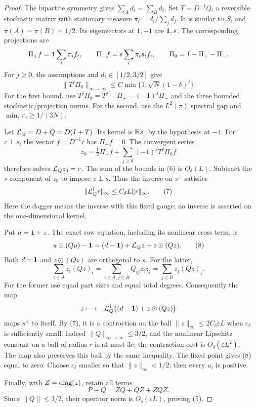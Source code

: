 \begin{proof}
The bipartite symmetry gives
\(\sum_A d_i=\sum_Bd_i\).
Set \(T=D^{-1}Q\), a reversible stochastic matrix with stationary
measure \(\pi_i=d_i/\sum_jd_j\).
It is similar to \(S\), and
\(\pi(A)=\pi(B)=1/2\).
Its eigenvectors at \(1,-1\) are \(\mathbf1,s\).
The corresponding projections are
\[
 \Pi_+f=\mathbf1\sum_i\pi_i f_i,\qquad
 \Pi_-f=s\sum_i\pi_i s_i f_i,\qquad
 \Pi_0=I-\Pi_+-\Pi_-.
\]
For \(j\geq0\), the assumptions and \(d_i\in[1/2,3/2]\) give
\[
 \|T^j\Pi_0\|_{\infty\to\infty}
 \leq C\min\{1,\sqrt N(1-\delta)^j\}.                         \tag{6}
\]
For the first bound, use \(T^j\Pi_0=T^j-\Pi_+-(-1)^j\Pi_-\)
and the three bounded stochastic/projection norms.
For the second, use the \(L^2(\pi)\) spectral gap and
\(\min_i\pi_i\geq1/(3N)\).

Let \({\cal L}_Q=D+Q=D(I+T)\).
Its kernel is \(\mathbb R s\), by the hypothesis at \(-1\).
For \(r\perp s\), the vector \(f=D^{-1}r\) has
\(\Pi_-f=0\).
The convergent series
\[
 z_0=\tfrac12\Pi_+f+
                 \sum_{j\geq0}(-1)^jT^j\Pi_0f
\]
therefore solves \({\cal L}_Qz_0=r\).
The sum of the bounds in (6) is \(O_\delta(L)\).
Subtract the \(s\)-component of \(z_0\) to impose \(z\perp s\).
Thus the inverse on \(s^\perp\) satisfies
\[
 \|{\cal L}_Q^\dagger r\|_\infty
                    \leq C_\delta L\|r\|_\infty.             \tag{7}
\]
Here the dagger means the inverse with this fixed gauge;
no inverse is asserted on the one-dimensional kernel.

Put \(u=\mathbf1+z\).
The exact row equation, including its nonlinear cross term, is
\[
 u\odot(Qu)-\mathbf1
 =(d-\mathbf1)+{\cal L}_Qz+z\odot(Qz).                           \tag{8}
\]
Both \(d-\mathbf1\) and \(z\odot(Qz)\) are orthogonal to \(s\).
For the latter,
\[
 \sum_{i\in A}z_i(Qz)_i
 =\sum_{i\in A,j\in B}Q_{ij}z_i z_j
 =\sum_{j\in B}z_j(Qz)_j.
\]
For the former use equal part sizes and equal total degrees.
Consequently the map
\[
 z\longmapsto-{\cal L}_Q^\dagger
                    \bigl((d-\mathbf1)+z\odot(Qz)\bigr)
\]
maps \(s^\perp\) to itself.
By (7), it is a contraction on the ball
\(\|z\|_\infty\leq2C_\delta\varepsilon L\) when
\(c_\delta\) is sufficiently small.
Indeed \(\|Q\|_{\infty\to\infty}\leq3/2\), and the nonlinear
Lipschitz constant on a ball of radius \(r\) is at most \(3r\);
the contraction cost is \(O_\delta(\varepsilon L^2)\).
The map also preserves this ball by the same inequality.
The fixed point gives (8) equal to zero.
Choose \(c_\delta\) smaller so that \(\|z\|_\infty<1/2\);
then every \(u_i\) is positive.

Finally, with \(Z=\operatorname{diag}(z)\), retain all terms
\[
 P-Q=ZQ+QZ+ZQZ.
\]
Since \(\|Q\|\leq3/2\), their operator norm is
\(O_\delta(\varepsilon L)\), proving (5).
\end{proof}

